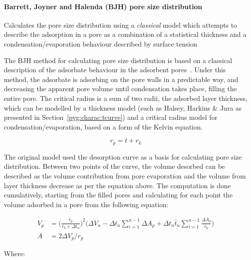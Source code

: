 \paragraph{Barrett, Joyner and Halenda (BJH) pore size distribution}


Calculates the pore size distribution using a \textit{classical} model which attempts to
describe the adsorption in a pore as a combination of a statistical thickness and
a condensation/evaporation behaviour described by surface tension

The BJH method for calculating pore size distribution
is based on a classical description of the adsorbate behaviour in the adsorbent
pores~\cite{barrettDeterminationPoreVolume1951}.
Under this method, the adsorbate is adsorbing on the pore walls in a predictable way,
and decreasing the apparent pore volume until condensation takes place, filling the
entire pore. The critical radius is a sum of two radii, the adsorbed 
layer thickness, which can be modelled by a thickness model
(such as Halsey, Harkins \& Jura as presented in Section~\ref{pyg:charac:tcurve}) 
and a critical radius model for condensation/evaporation, 
based on a form of the Kelvin equation.

\begin{equation}
    r_p = t + r_k
\end{equation}

The original model used the desorption curve as a basis for calculating pore size distribution.
Between two points of the curve, the volume desorbed can be described as the volume contribution
from pore evaporation and the volume from layer thickness decrease as per the equation
above. The computation is done cumulatively, starting from the filled pores and 
calculating for each point the volume adsorbed in a pore from the following equation:

\begin{align}
    V_p & = \Big( \frac{\bar{r}_p}{\bar{r}_k + \Delta t_n} \Big)^2
    \Big(\Delta V_n - \Delta t_n \sum_{i=1}^{n-1} \Delta A_p
    + \Delta t_n \bar{t}_n \sum_{i=1}^{n-1} \frac{\Delta A_p}{\bar{r}_p}\Big) \\
    A & = 2 \Delta V_p / r_p
\end{align}

Where:

